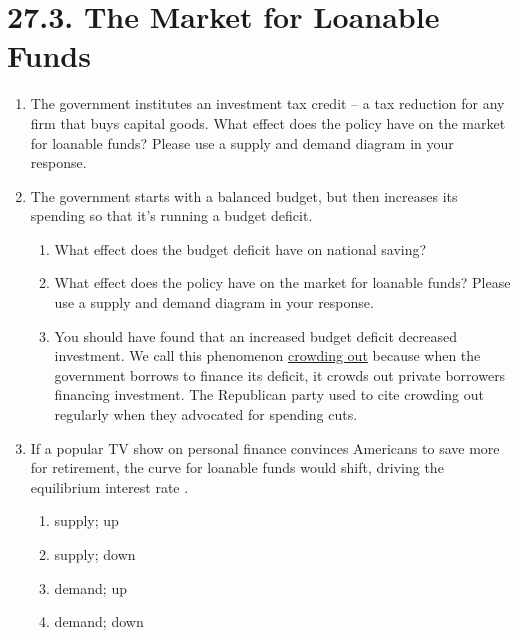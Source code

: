 \documentclass{article}
\begin{document}
\section*{27.3. The Market for Loanable Funds}

\begin{enumerate}

\item The government institutes an investment tax credit -- a tax reduction for any firm that buys capital goods. What effect does the policy have on the market for loanable funds? Please use a supply and demand diagram in your response.

\item The government starts with a balanced budget, but then increases its spending so that it's running a budget deficit.

	\begin{enumerate}
	
	\item What effect does the budget deficit have on national saving?
	
	\item What effect does the policy have on the market for loanable funds? Please use a supply and demand diagram in your response. 
	
	\item You should have found that an increased budget deficit decreased investment. We call this phenomenon \underline{crowding out} because when the government borrows to finance its deficit, it crowds out private borrowers financing investment. The Republican party used to cite crowding out regularly when they advocated for spending cuts.
	
	\end{enumerate}
	
\item If a popular TV show on personal finance convinces Americans to save more for retirement, the \underline{\phantom{xxxxxxxxxx}} curve for loanable funds would shift, driving the equilibrium interest rate \underline{\phantom{xxxxxxxxxx}}.

	\begin{enumerate}
	
	\item supply; up
	
	\item supply; down
	
	\item demand; up
	
	\item demand; down
	

\end{enumerate}
\end{enumerate}
\end{document}

